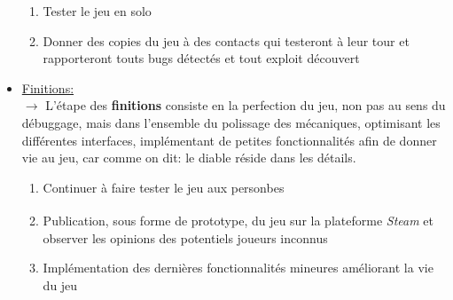 \documentclass{article}
\def\reg{\small{\textsuperscript{\textregistered}}}
\begin{document}
\begin{itemize}
                \begin{enumerate}
                    \item Tester le jeu en solo
                    \item Donner des copies du jeu à des contacts qui testeront à leur tour et rapporteront touts bugs détectés et tout exploit découvert
                \end{enumerate}  
            \item \underline{Finitions:}\\
                $\rightarrow$ L'étape des \textbf{finitions} consiste en la perfection du jeu, non pas au sens du débuggage, mais dans l'ensemble du polissage des mécaniques, optimisant les différentes interfaces, implémentant de petites fonctionnalités afin de donner vie au jeu, car comme on dit: le diable réside dans les détails.
                \begin{enumerate}
                    \item Continuer à faire tester le jeu aux personbes
                    \item Publication, sous forme de prototype, du jeu sur la plateforme \textit{Steam\reg} et observer les opinions des potentiels joueurs inconnus
                    \item Implémentation des dernières fonctionnalités mineures améliorant la vie du jeu
                \end{enumerate}
        \end{itemize}
        
\end{document}
